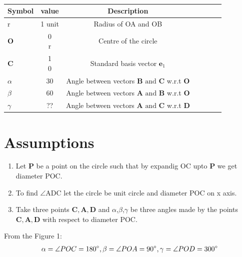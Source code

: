 \documentclass[12pt]{article}
\newcommand{\myvec}[1]{\ensuremath{\begin{pmatrix}#1\end{pmatrix}}}
\let\vec\mathbf
\begin{document}
\begin{table}[htbp]
 \begin{center}
    \begin{tabular}{|l|c|c|c|c|c|c} \hline \textbf{Symbol}
  & \textbf{value} & \textbf{Description} \\
 \hline
	    r &1 unit& Radius of OA and OB\\ \hline
	    $\vec{O}$ &\myvec{0\\r} & Centre of the circle\\ \hline
	    $\vec{C}$ &\myvec{1\\0} & Standard basis vector $\vec{e}_1$\\ \hline
	    $\alpha$ & 30\degree&Angle between vectors $\vec{B} \text{ and } \vec{C}$ w.r.t $\vec{O}$ \\ \hline
	    $\beta$ & 60\degree&Angle between vectors $\vec{A} \text{ and } \vec{B}$ w.r.t $\vec{O}$ \\ \hline
	    $\gamma$ & ??&Angle between vectors $\vec{A} \text{ and } \vec{C}$ w.r.t $\vec{D}$ \\ \hline
\end{tabular}   
\end{center}
\caption{\label{table:dummytable} }
\end{table}

\section*{\large Assumptions}
\begin{enumerate}
	\item Let $\vec{P}$ be a point on the circle such that by expandig OC upto $\vec{P}$ we get diameter POC.
\item To find $\angle$ADC let the circle be unit circle and diameter POC on x axis.
\item Take three points $\vec{C,A,D}$ and $\alpha$,$\beta$,$\gamma$ be three angles made by the points $\vec{C,A,D}$ with respect to diameter POC.
\end{enumerate}
From the Figure 1:
\begin{align}
\alpha = {\angle POC}= 180\degree, 
\beta= {\angle POA} = 90\degree,
\gamma = {\angle POD}=300\degree
\end{align}
\end{document}
